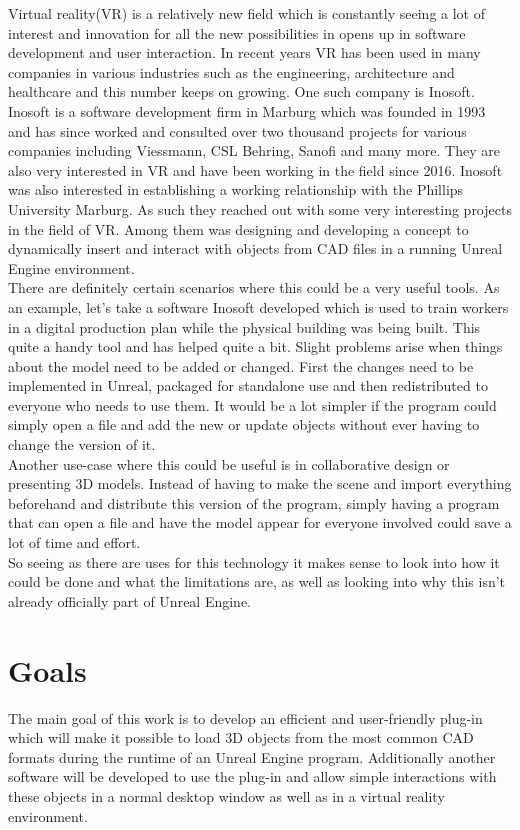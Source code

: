 Virtual reality(VR) is a relatively new field which is constantly seeing a lot of interest and innovation for all the new possibilities in opens up in software development and user interaction. In recent years VR has been used in many companies in various industries such as the engineering, architecture and healthcare and this number keeps on growing. One such company is Inosoft\cite{}.\\
Inosoft is a software development firm in Marburg which was founded in 1993 and has since worked and consulted over two thousand projects for various companies including Viessmann, CSL Behring, Sanofi and many more. They are also very interested in VR and have been working in the field since 2016. Inosoft was also interested in establishing a working relationship with the Phillips University Marburg. As such they reached out with some very interesting projects in the field of VR. Among them was designing and developing a concept to dynamically insert and interact with objects from CAD files in a running Unreal Engine environment.\\
There are definitely certain scenarios where this could be a very useful tools. As an example, let's take a software Inosoft developed which is used to train workers in a digital production plan while the physical building was being built. This quite a handy tool and has helped quite a bit\cite{Inosoft}. Slight problems arise when things about the model need to be added or changed. First the changes need to be implemented in Unreal, packaged for standalone use and then redistributed to everyone who needs to use them. It would be a lot simpler if the program could simply open a file and add the new or update objects without ever having to change the version of it.\\
Another use-case where this could be useful is in collaborative design or presenting 3D models. Instead of having to make the scene and import everything beforehand and distribute this version of the program, simply having a program that can open a file and have the model appear for everyone involved could save a lot of time and effort.\\
So seeing as there are uses for this technology it makes sense to look into how it could be done and what the limitations are, as well as looking into why this isn't already officially part of Unreal Engine.

\section{Goals}\label{chp:Goals}   
The main goal of this work is to develop an efficient and user-friendly plug-in which will make it possible to load 3D objects from the most common CAD formats during the runtime of an Unreal Engine program. Additionally another software will be developed to use the plug-in and allow simple interactions with these objects in a normal desktop window as well as in a virtual reality environment.

